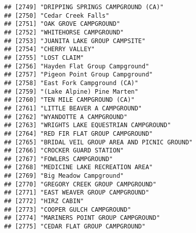 \documentclass[
]{article}
\begin{document}
\begin{verbatim}
## [2749] "DRIPPING SPRINGS CAMPGROUND (CA)"                                                    
## [2750] "Cedar Creek Falls"                                                                   
## [2751] "OAK GROVE CAMPGROUND"                                                                
## [2752] "WHITEHORSE CAMPGROUND"                                                               
## [2753] "JUANITA LAKE GROUP CAMPSITE"                                                         
## [2754] "CHERRY VALLEY"                                                                       
## [2755] "LOST CLAIM"                                                                          
## [2756] "Hayden Flat Group Campground"                                                        
## [2757] "Pigeon Point Group Campground"                                                       
## [2758] "East Fork Campground (CA)"                                                           
## [2759] "(Lake Alpine) Pine Marten"                                                           
## [2760] "TEN MILE CAMPGROUND (CA)"                                                            
## [2761] "LITTLE BEAVER A CAMPGROUND"                                                          
## [2762] "WYANDOTTE A CAMPGROUND"                                                              
## [2763] "WRIGHTS LAKE EQUESTRIAN CAMPGROUND"                                                  
## [2764] "RED FIR FLAT GROUP CAMPGROUND"                                                       
## [2765] "BRIDAL VEIL GROUP AREA AND PICNIC GROUND"                                            
## [2766] "CROCKER GUARD STATION"                                                               
## [2767] "FOWLERS CAMPGROUND"                                                                  
## [2768] "MEDICINE LAKE RECREATION AREA"                                                       
## [2769] "Big Meadow Campground"                                                               
## [2770] "GREGORY CREEK GROUP CAMPGROUND"                                                      
## [2771] "EAST WEAVER GROUP CAMPGROUND"                                                        
## [2772] "HIRZ CABIN"                                                                          
## [2773] "COOPER GULCH CAMPGROUND"                                                             
## [2774] "MARINERS POINT GROUP CAMPGROUND"                                                     
## [2775] "CEDAR FLAT GROUP CAMPGROUND"                                                         

\end{verbatim}
\end{document}
